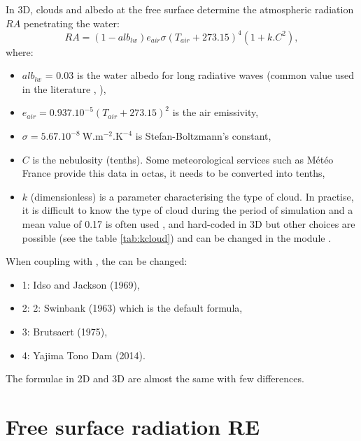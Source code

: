 In 3D, clouds and albedo at
the free surface determine the atmospheric radiation $RA$ penetrating the water:
\begin{equation*}
RA = (1-alb_{lw}) e_{air}\sigma(T_{air}+273.15)^{4}(1+k . C^{2}),
\end{equation*}
where:
\begin{itemize}
\item $alb_{lw}$ = 0.03 is the water albedo for long radiative waves
  (common value used in the literature \cite{imerito_dyresm_2007},
  \cite{henderson-sellers_energy_balance_1986}),
\item $e_{air} = 0.937.10^{-5}(T_{air}+273.15)^{2}$ is the air emissivity,
\item $\sigma= 5.67.10^{-8}~\mathrm{{W.m^{-2}.K^{-4}}}$ is Stefan-Boltzmann's constant,
\item $C$ is the nebulosity (tenths). Some meteorological services such as
M\'{e}t\'{e}o France provide this data in octas, it needs to be converted
into tenths,
\item $k$ (dimensionless) is a parameter characterising the type of
cloud. In practise, it is difficult to know the type of cloud during the
period of simulation and a mean value of 0.17 is often used \cite{tva_heat_1972},
\cite{imerito_dyresm_2007}
and hard-coded in 3D but other choices are possible
(see the table \ref{tab:kcloud}) and can be changed in the module
.
\end{itemize}

When coupling \waqtel with , the 
can be changed:
\begin{itemize}
\item 1: Idso and Jackson (1969),
\item 2: 2: Swinbank (1963) which is the default formula,
\item 3: Brutsaert (1975),
\item 4: Yajima Tono Dam (2014).
\end{itemize}

The formulae in 2D and 3D are almost the same with few differences.


\section{Free surface radiation RE}

